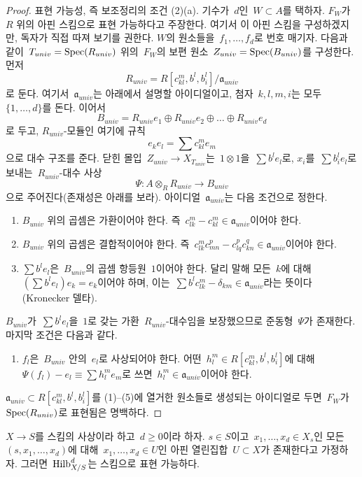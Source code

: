 \begin{proof}
\medskip\noindent
표현 가능성, 즉 보조정리의 조건 (2)(a). 기수가\  $d$인\ 
$W \subset A$를 택하자. $F_W$가\  $R$ 위의 아핀 스킴으로 표현 가능하다고
주장한다. 여기서 이 아핀 스킴을 구성하겠지만, 독자가 직접 따져 보기를
권한다. $W$의 원소들을\  $f_1, \ldots, f_d$로 번호 매기자. 다음과 같이\ 
$T_{univ} = \mathop{\mathrm{Spec}}(R_{univ})$ 위의\  $F_W$의 보편 원소\ 
$Z_{univ} = \mathop{\mathrm{Spec}}(B_{univ})$를 구성한다. 먼저
$$
R_{univ} = R[c_{kl}^m, b^l, b_i^l]/\mathfrak a_{univ}
$$
로 둔다. 여기서\  $\mathfrak a_{univ}$는 아래에서 설명할 아이디얼이고,
첨자\  $k, l, m, i$는 모두\  $\{1, \ldots, d\}$를 돈다. 이어서
$$
B_{univ} = R_{univ}e_1 \oplus R_{univ}e_2 \oplus \ldots \oplus R_{univ}e_d
$$
로 두고, $R_{univ}$-모듈인 여기에 규칙
$$
e_ke_l = \sum c_{kl}^m e_m
$$
으로 대수 구조를 준다. 닫힌 몰입\  $Z_{univ} \to X_{T_{univ}}$는\ 
$1 \otimes 1$을\  $\sum b^le_l$로, $x_i$를\  $\sum b_i^le_l$로 보내는\ 
$R_{univ}$-대수 사상
$$
\Psi : A \otimes_R R_{univ} \longrightarrow B_{univ}
$$
으로 주어진다(존재성은 아래를 보라). 아이디얼\  $\mathfrak a_{univ}$는
다음 조건으로 정한다.
\begin{enumerate}
\item $B_{univ}$ 위의 곱셈은 가환이어야 한다. 즉\ 
$c_{lk}^m - c_{kl}^m \in \mathfrak a_{univ}$이어야 한다.
\item $B_{univ}$ 위의 곱셈은 결합적이어야 한다. 즉\ 
$c_{lk}^m c_{m n}^p - c_{lq}^p c_{kn}^q \in \mathfrak a_{univ}$이어야 한다.
\item $\sum b^le_l$은\  $B_{univ}$의 곱셈 항등원\  $1$이어야 한다.
달리 말해 모든\  $k$에 대해\  $(\sum b^le_l)e_k = e_k$이어야 하며,
이는\  $\sum b^lc_{lk}^m - \delta_{km} \in \mathfrak a_{univ}$라는 뜻이다
(Kronecker 델타).
\end{enumerate}
$B_{univ}$가\  $\sum b^le_l$을\  $1$로 갖는 가환\ 
$R_{univ}$-대수임을 보장했으므로 준동형\  $\Psi$가 존재한다.
마지막 조건은 다음과 같다.
\begin{enumerate}
\item[(5)] $f_l$은\  $B_{univ}$ 안의\  $e_l$로 사상되어야 한다.
어떤\  $h_l^m \in R[c_{kl}^m, b^l, b_i^l]$에 대해\ 
$\Psi(f_l) - e_l \equiv \sum h_l^me_m$로 쓰면\ 
$h_l^m \in \mathfrak a_{univ}$이어야 한다.
\end{enumerate}
$\mathfrak a_{univ} \subset R[c_{kl}^m, b^l, b_i^l]$를 (1)--(5)에
열거한 원소들로 생성되는 아이디얼로 두면\  $F_W$가\ 
$\mathop{\mathrm{Spec}}(R_{univ})$로 표현됨은 명백하다.
\end{proof}

\begin{proposition}
\label{proposition-hilb-d-representable}
$X \to S$를 스킴의 사상이라 하고\  $d \geq 0$이라 하자.
$s \in S$이고\  $x_1, \ldots, x_d \in X_s$인 모든\ 
$(s, x_1, \ldots, x_d)$에 대해\  $x_1, \ldots, x_d \in U$인 아핀 열린집합\ 
$U \subset X$가 존재한다고 가정하자. 그러면\  $\mathrm{Hilb}^d_{X/S}$는
스킴으로 표현 가능하다.
\end{proposition}

